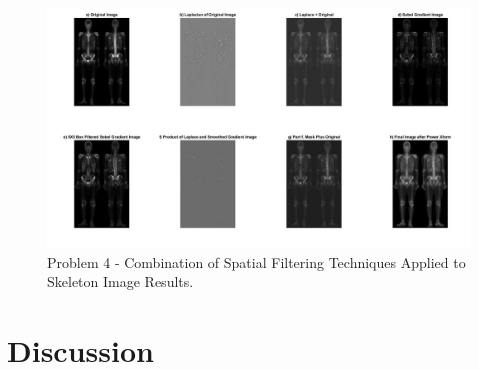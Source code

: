 \documentclass[./rarnold_report3.tex]{subfiles}
\begin{document}
	\begin{figure}[!htbp]
	\centering
	\includegraphics[scale=0.45]{"skeleton"}
	\caption{Problem 4 - Combination of Spatial Filtering Techniques Applied to Skeleton Image Results.} 
	\label{skeleton}
	\end{figure}

\clearpage

\section*{Discussion}
\end{document}
